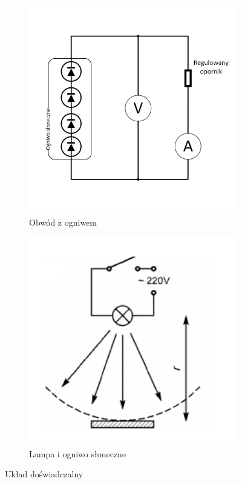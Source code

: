 \documentclass[12pt,a4paper]{article}
\begin{document}
\begin{figure}[H]
\centering
\begin{subfigure}{.5\textwidth}
  \centering
  \includegraphics[width=1\textwidth]{img_fiz/Circuit}
  \caption{Obwód z ogniwem}
  \label{fig:sub1}
\end{subfigure}%
\begin{subfigure}{.5\textwidth}
  \centering
  \includegraphics[width=1\textwidth]{img_fiz/Lamp}
  \caption{Lampa i ogniwo słoneczne}
  \label{fig:sub2}
\end{subfigure}
\caption{Układ doświadczalny}
\label{fig:test}
\end{figure}
\end{document}

